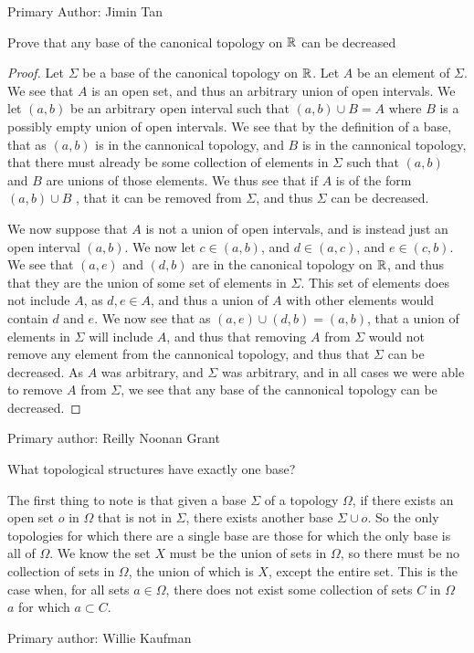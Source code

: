 Primary Author: Jimin Tan

\begin{minorEx}[Riddle]%
  Prove that any base of the canonical topology on $\mathbb{R}$ can be decreased
\end{minorEx}
\begin{proof}
  Let $\Sigma$ be a base of the canonical topology on $\mathbb{R}$. Let $A$ be an element of 
  $\Sigma$. We see that $A$ is an open set, and thus an arbitrary
  union of open intervals. We let $(a,b)$  be an arbitrary open
  interval such that $(a,b)\cup B =A$ where $B$ is a possibly empty
  union of open intervals. We see that by the definition of a base,
  that as $(a,b)$ is in the cannonical topology, and $B$ is in the
  cannonical topology, that there must already be some collection of
  elements in $\Sigma$ such that $(a,b)$ and $B$ are unions of those
  elements. We thus see that if $A$ is of the form $(a,b)\cup B$ , that
  it can be removed from $\Sigma$, and thus $\Sigma$ 
  can be decreased. 

  We now suppose that $A$ is not a union of open intervals, and is instead
  just an open interval $(a,b)$. We now let $c\in (a,b)$, and
  $d\in (a,c)$, and $e\in (c,b)$. We see that $(a,e)$ and $(d,b)$ are
  in the canonical topology on $\mathbb{R}$, and thus that they are the union
  of some set of elements in $\Sigma$. This set of elements does not
  include $A$, as $d,e\in A$, and thus a union of $A$ with other
  elements would contain $d$ and $e$. We now see that as 
  $(a,e)\cup (d,b) = (a,b)$, that a union of elements in $\Sigma$ will
  include $A$, and thus that removing $A$ from $\Sigma$ would not
  remove any element from the cannonical topology, and thus that
  $\Sigma$ can be decreased. As $A$ was arbitrary, and $\Sigma$ was
  arbitrary, and in all cases we were able to remove $A$ from
  $\Sigma$, we see that any base of the cannonical topology 
  can be decreased.
\end{proof}

Primary author: Reilly Noonan Grant

\begin{minorEx}[Riddle]%
What topological structures have exactly one base?
\end{minorEx}
The first thing to note is that given a base $\Sigma$ of a topology $\Omega$, if there exists an open set $o$ in $\Omega$ that is not in $\Sigma$, there exists another base $\Sigma \cup o$. So the only topologies for which there are a single base are those for which the only base is all of $\Omega$. We know the set $X$ must be the union of sets in $\Omega$, so there must be no collection of sets in $\Omega$, the union of which is $X$, except the entire set. This is the case when, for all sets $a \in \Omega$, there does not exist some collection of sets $C$ in $\Omega$ \ $a$ for which $a \subset C$.

Primary author: Willie Kaufman 

